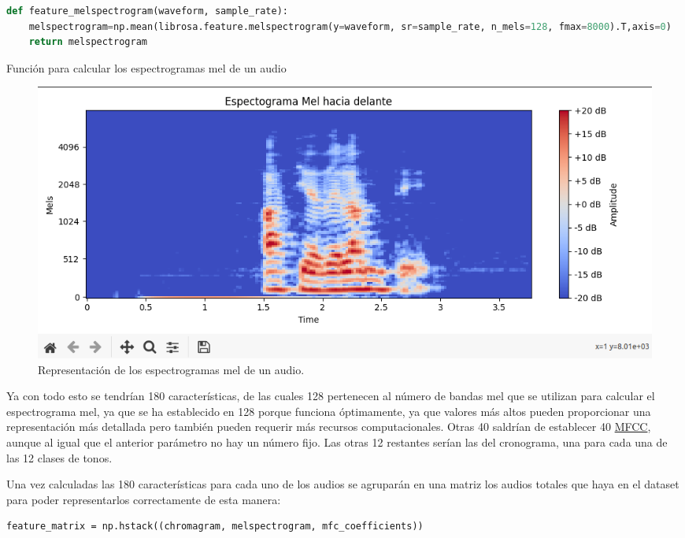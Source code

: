\begin{code}[H]
\begin{lstlisting}[language=Python]
def feature_melspectrogram(waveform, sample_rate):
    melspectrogram=np.mean(librosa.feature.melspectrogram(y=waveform, sr=sample_rate, n_mels=128, fmax=8000).T,axis=0)
    return melspectrogram
\end{lstlisting}
\caption[Función para calcular los espectrogramas mel de un audio]{Función para calcular los espectrogramas mel de un audio}
\label{cod:codejemplo5}
\end{code}

\begin{figure}[H]
  \centering
  \includegraphics[scale=0.4]{figs/mel_spectrogram} %
  \caption{ Representación de los espectrogramas mel de un audio.}
  \label{fig:melios}
\end{figure}

Ya con todo esto se tendrían 180 características, de las cuales 128 pertenecen al número de bandas mel que se utilizan para calcular el espectrograma mel, ya que se ha establecido en 128 porque funciona óptimamente, ya que valores más altos pueden proporcionar una representación más detallada pero también pueden requerir más recursos computacionales. Otras 40 saldrían de establecer 40 \hyperlink{MFCC}{MFCC}, aunque al igual que el anterior parámetro no hay un número fijo. Las otras 12 restantes serían las del cronograma, una para cada una de las 12 clases de tonos.

Una vez calculadas las 180 características para cada uno de los audios se agruparán en una matriz los audios totales que haya en el dataset para poder representarlos correctamente de esta manera:

\begin{verbatim}
feature_matrix = np.hstack((chromagram, melspectrogram, mfc_coefficients))
\end{verbatim}

